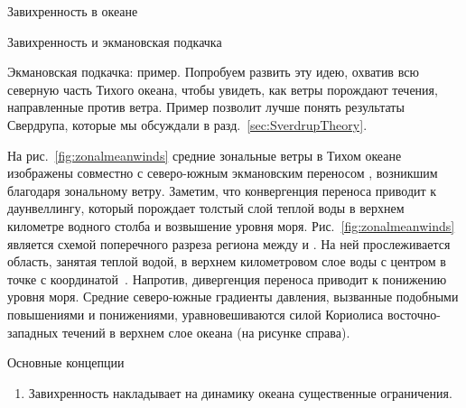 \begin{chapter}{Завихренность в океане}
\begin{section}{Завихренность и экмановская подкачка}
\begin{paragraph}{Экмановская подкачка: пример.}
Попробуем развить эту идею, охватив всю северную часть Тихого океана, 
чтобы увидеть, как ветры порождают течения, направленные против ветра. 
Пример позволит лучше понять результаты Свердрупа, которые мы обсуждали
в разд.~\ref{sec:SverdrupTheory}.
%

На рис.~\ref{fig:zonalmeanwinds} средние зональные ветры в Тихом океане
изображены совместно с северо-южным экмановским переносом%
, возникшим благодаря зональному
ветру. Заметим, что конвергенция переноса 
приводит к даунвеллингу, который порождает толстый слой теплой воды 
в верхнем километре водного столба и возвышение уровня моря. 
Рис.~\ref{fig:zonalmeanwinds} является схемой поперечного разреза
региона между  и . На ней прослеживается область,
занятая теплой водой, в верхнем километровом слое воды с центром в точке 
с координатой~.
Напротив, дивергенция переноса приводит к понижению уровня моря. 
Средние северо-южные градиенты давления, вызванные подобными повышениями 
и понижениями, уравновешиваются силой Кориолиса восточно-западных 
течений в верхнем слое океана 
(на рисунке справа).
%
\end{paragraph}
\end{section}

\begin{section}{Основные концепции}
\begin{enumerate}
\item
Завихренность накладывает на динамику океана существенные ограничения. 
%


\end{enumerate}
\end{section}
\end{chapter}
